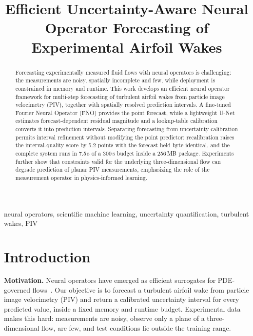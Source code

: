 \documentclass[conference,10pt]{IEEEtran}
\begin{document}
\title{Efficient Uncertainty-Aware Neural Operator Forecasting of Experimental Airfoil Wakes}

\author{
}

\maketitle

\begin{abstract}
Forecasting experimentally measured fluid flows with neural operators is challenging: the measurements are noisy, spatially incomplete and few, while deployment is constrained in memory and runtime. This work develops an efficient neural operator framework for multi-step forecasting of turbulent airfoil wakes from particle image velocimetry (PIV), together with spatially resolved prediction intervals. A fine-tuned Fourier Neural Operator (FNO) provides the point forecast, while a lightweight U-Net estimates forecast-dependent residual magnitude and a lookup-table calibration converts it into prediction intervals. Separating forecasting from uncertainty calibration permits interval refinement without modifying the point predictor: recalibration raises the interval-quality score by 5.2 points with the forecast held byte identical, and the complete system runs in 7.5\,s of a 300\,s budget inside a 256\,MB package. Experiments further show that constraints valid for the underlying three-dimensional flow can degrade prediction of planar PIV measurements, emphasizing the role of the measurement operator in physics-informed learning.
\end{abstract}

\begin{IEEEkeywords}
neural operators, scientific machine learning, uncertainty quantification, turbulent wakes, PIV
\end{IEEEkeywords}

\section{Introduction}
\textbf{Motivation.} Neural operators have emerged as efficient surrogates for PDE-governed flows~\cite{fno}. Our objective is to forecast a turbulent airfoil wake from particle image velocimetry (PIV) and return a calibrated uncertainty interval for every predicted value, inside a fixed memory and runtime budget. Experimental data makes this hard: measurements are noisy, observe only a plane of a three-dimensional flow, are few, and test conditions lie outside the training range.
\end{document}
